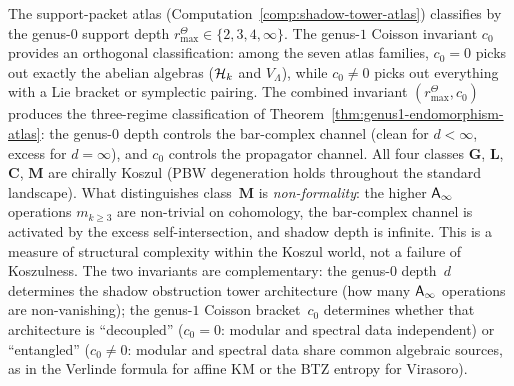 \begin{remark}%
\label{rem:genus1-dichotomy}%
%
%
The support-packet atlas
(Computation~\ref{comp:shadow-tower-atlas}) classifies by
the genus-$0$ support depth
\(r^\Theta_{\max}\in \{2,3,4,\infty\}\).
The genus-$1$ Coisson invariant $c_0$ provides an
orthogonal classification: among the seven atlas families,
$c_0 = 0$ picks out exactly the abelian algebras
($\mathcal{H}_k$ and $V_\Lambda$), while $c_0 \ne 0$ picks
out everything with a Lie bracket or symplectic pairing.
The combined invariant \((r^\Theta_{\max}, c_0)\) produces the
three-regime classification of
Theorem~\ref{thm:genus1-endomorphism-atlas}:
the genus-$0$ depth controls the bar-complex channel
(clean for $d < \infty$, excess for $d = \infty$),
and $c_0$ controls the propagator channel.
All four classes $\mathbf{G}$, $\mathbf{L}$,
$\mathbf{C}$, $\mathbf{M}$ are chirally Koszul (PBW
degeneration holds throughout the standard landscape).
What distinguishes class~$\mathbf{M}$ is
\emph{non-formality}: the higher $\mathsf{A}_{\infty}$ operations
$m_{k \ge 3}$ are non-trivial on cohomology,
the bar-complex channel is activated by the excess
self-intersection, and shadow depth is infinite.
This is a measure of structural complexity within the
Koszul world, not a failure of Koszulness.
The two invariants are complementary: the genus-$0$ depth~$d$
determines the shadow obstruction tower architecture (how many $\mathsf{A}_{\infty}$
operations are non-vanishing); the genus-$1$ Coisson bracket~$c_0$
determines whether that architecture is ``decoupled''
($c_0 = 0$: modular and spectral data independent) or
``entangled'' ($c_0 \ne 0$: modular and spectral data share
common algebraic sources, as in the Verlinde formula for
affine KM or the BTZ entropy for Virasoro).
\end{remark}


